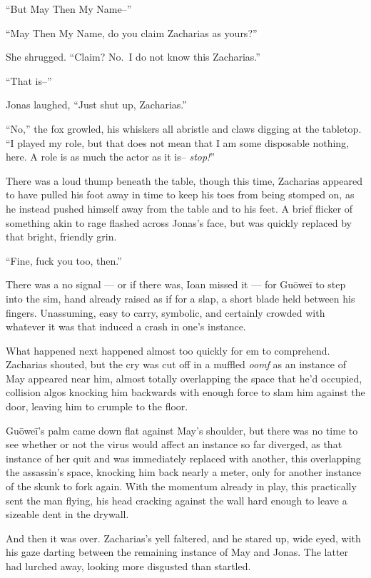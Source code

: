 ``But May Then My Name--''

``May Then My Name, do you claim Zacharias as yours?''

She shrugged. ``Claim? No.~I do not know this Zacharias.''

``That is--''

Jonas laughed, ``Just shut up, Zacharias.''

``No,'' the fox growled, his whiskers all abristle and claws digging at the tabletop. ``I played my role, but that does not mean that I am some disposable nothing, here. A role is as much the actor as it is-- \emph{stop!}''

There was a loud thump beneath the table, though this time, Zacharias appeared to have pulled his foot away in time to keep his toes from being stomped on, as he instead pushed himself away from the table and to his feet. A brief flicker of something akin to rage flashed across Jonas's face, but was quickly replaced by that bright, friendly grin.

``Fine, fuck you too, then.''

There was a no signal — or if there was, Ioan missed it — for Guōweī to step into the sim, hand already raised as if for a slap, a short blade held between his fingers. Unassuming, easy to carry, symbolic, and certainly crowded with whatever it was that induced a crash in one's instance.

What happened next happened almost too quickly for em to comprehend. Zacharias shouted, but the cry was cut off in a muffled \emph{oomf} as an instance of May appeared near him, almost totally overlapping the space that he'd occupied, collision algos knocking him backwards with enough force to slam him against the door, leaving him to crumple to the floor.

Guōweī's palm came down flat against May's shoulder, but there was no time to see whether or not the virus would affect an instance so far diverged, as that instance of her quit and was immediately replaced with another, this overlapping the assassin's space, knocking him back nearly a meter, only for another instance of the skunk to fork again. With the momentum already in play, this practically sent the man flying, his head cracking against the wall hard enough to leave a sizeable dent in the drywall.

And then it was over. Zacharias's yell faltered, and he stared up, wide eyed, with his gaze darting between the remaining instance of May and Jonas. The latter had lurched away, looking more disgusted than startled.

